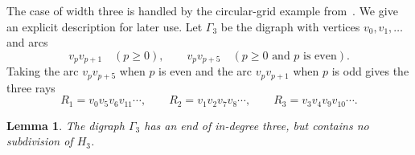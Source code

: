 \documentclass[11pt]{article}
\newtheorem{lemma}[theorem]{Lemma}
\theoremstyle{remark}
\numberwithin{equation}{section}
\begin{document}
The case of width three is handled by the circular-grid example from~\cite{HamannHeuerGrids}. We give an explicit
description for later use. Let $\Gamma_3$ be the digraph with vertices $v_0,v_1,\ldots$ and arcs
\begin{equation}\label{eq:Gamma3}
v_pv_{p+1}\quad(p\ge0),
\qquad
v_pv_{p+5}\quad(p\ge0\text{ and }p\text{ is even}).
\end{equation}
Taking the arc $v_pv_{p+5}$ when $p$ is even and the arc $v_pv_{p+1}$ when $p$ is odd gives the three rays
\[
R_1=v_0v_5v_6v_{11}\cdots,
\qquad
R_2=v_1v_2v_7v_8\cdots,
\qquad
R_3=v_3v_4v_9v_{10}\cdots.
\]

\begin{lemma}\label{lem:Gamma3}
The digraph $\Gamma_3$ has an end of in-degree three, but contains no subdivision of $H_3$.
\end{lemma}
\end{document}
